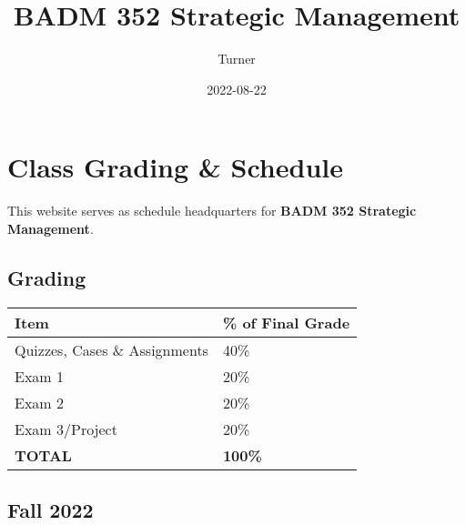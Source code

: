 \documentclass[
]{book}
\title{BADM 352 Strategic Management}
\author{Turner}
\date{2022-08-22}
\begin{document}
\maketitle

{
\setcounter{tocdepth}{1}
\tableofcontents
}
\hypertarget{class-grading-schedule}{%
\chapter*{Class Grading \& Schedule}\label{class-grading-schedule}}

This website serves as schedule headquarters for \textbf{BADM 352 Strategic Management}.

\hypertarget{grading}{%
\section*{Grading}\label{grading}}

\begin{longtable}[]{@{}ll@{}}
\toprule
Item & \% of Final Grade \\
\midrule
\endhead
Quizzes, Cases \& Assignments & 40\% \\
Exam 1 & 20\% \\
Exam 2 & 20\% \\
Exam 3/Project & 20\% \\
\textbf{TOTAL} & \textbf{100\%} \\
\bottomrule
\end{longtable}

\hypertarget{fall-2022}{%
\section*{Fall 2022}\label{fall-2022}}
\end{document}
